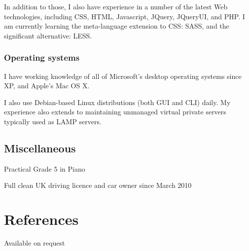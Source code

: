 \documentclass[11pt,a4paper]{article}
\begin{document}
In addition to those, I also have experience in a number of the latest Web
technologies, including CSS, HTML, Javascript, JQuery, JQueryUI, and PHP. I am
currently learning the meta-language extension to CSS: SASS, and the
significant alternative: LESS.
\subsubsection*{Operating systems}
I have working knowledge of all of Microsoft's desktop operating systems since
XP, and Apple's Mac OS X.

I also use Debian-based Linux distributions (both GUI and CLI) daily. My
experience also extends to maintaining unmanaged virtual private servers
typically used as LAMP servers.
\subsection*{Miscellaneous}
Practical Grade 5 in Piano

Full clean UK driving licence and car owner since March 2010
\section*{References}
Available on request
\end{document}
